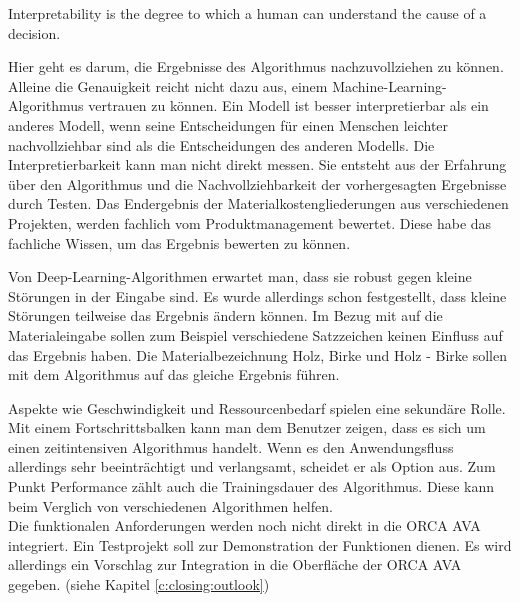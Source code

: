\begin{definition}[Interpretierbarkeit]
	\label{d:interpretability}
	\glqq Interpretability is the degree to which a human can understand the cause of a decision.\grqq{}\citep{miller_2017}
\end{definition}
Hier geht es darum, die Ergebnisse des Algorithmus nachzuvollziehen zu können. Alleine die Genauigkeit reicht nicht dazu aus, einem Machine-Learning-Algorithmus vertrauen zu können.
Ein Modell ist besser interpretierbar als ein anderes Modell, wenn seine Entscheidungen für einen Menschen leichter nachvollziehbar sind als die Entscheidungen des anderen Modells. Die Interpretierbarkeit kann man nicht direkt messen. Sie entsteht aus der Erfahrung über den Algorithmus und die Nachvollziehbarkeit der vorhergesagten Ergebnisse durch Testen.  \citep{molnar2022} Das Endergebnis der Materialkostengliederungen aus verschiedenen Projekten, werden fachlich vom Produktmanagement bewertet. Diese habe das fachliche Wissen, um das Ergebnis bewerten zu können.


Von Deep-Learning-Algorithmen erwartet man, dass sie robust gegen kleine Störungen in der Eingabe sind. Es wurde allerdings schon festgestellt, dass kleine Störungen teilweise das Ergebnis ändern können. \citep{Szegedy_2013} Im Bezug mit auf die Materialeingabe sollen zum Beispiel verschiedene Satzzeichen keinen Einfluss auf das Ergebnis haben. Die Materialbezeichnung \glqq Holz, Birke\grqq{} und \glqq Holz - Birke\grqq{} sollen mit dem Algorithmus auf das gleiche Ergebnis führen.


Aspekte wie Geschwindigkeit und Ressourcenbedarf spielen eine sekundäre Rolle. Mit einem Fortschrittsbalken kann man dem Benutzer zeigen, dass es sich um einen zeitintensiven Algorithmus handelt. Wenn es den Anwendungsfluss allerdings sehr beeinträchtigt und verlangsamt, scheidet er als Option aus. Zum Punkt Performance zählt auch die Trainingsdauer des Algorithmus. Diese kann beim Verglich von verschiedenen Algorithmen helfen.\\

Die funktionalen Anforderungen werden noch nicht direkt in die ORCA AVA integriert. Ein Testprojekt soll zur Demonstration der Funktionen dienen. Es wird allerdings ein Vorschlag zur Integration in die Oberfläche der ORCA AVA gegeben. (siehe Kapitel \ref{c:closing:outlook})



